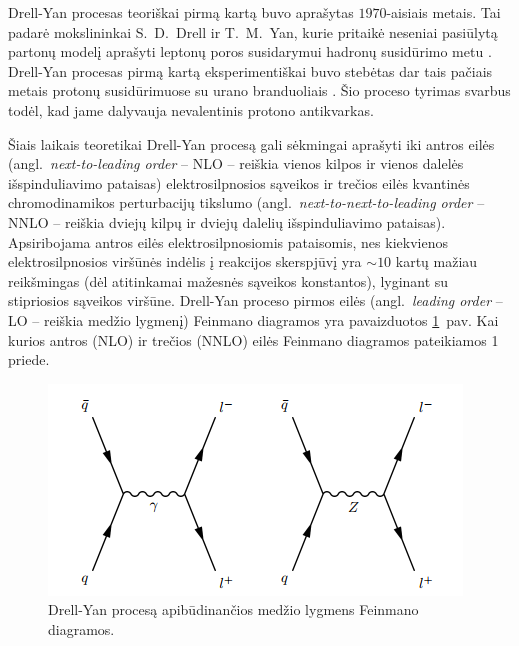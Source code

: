 \documentclass[a4paper, 12pt, oneside]{article}
\begin{document}
Drell-Yan procesas teoriškai pirmą kartą buvo aprašytas $1970$-aisiais metais.
Tai padarė mokslininkai S.~D.~Drell ir T.~M.~Yan, kurie pritaikė neseniai pasiūlytą partonų modelį aprašyti
leptonų poros susidarymui hadronų susidūrimo metu \cite{DYoriginal}.
Drell-Yan procesas pirmą kartą eksperimentiškai buvo stebėtas dar tais pačiais metais protonų susidūrimuose
su urano branduoliais \cite{DY_firstExp}.
Šio proceso tyrimas svarbus todėl, kad jame dalyvauja nevalentinis protono antikvarkas.

Šiais laikais teoretikai Drell-Yan procesą gali sėkmingai aprašyti iki antros eilės (angl.\ \textit{next-to-leading order} -- NLO --
reiškia vienos kilpos ir vienos dalelės išspinduliavimo pataisas) elektrosilpnosios sąveikos
ir trečios eilės kvantinės chromodinamikos perturbacijų tikslumo (angl.\ \textit{next-to-next-to-leading order} -- NNLO --
reiškia dviejų kilpų ir dviejų dalelių išspinduliavimo pataisas).
Apsiribojama antros eilės elektrosilpnosiomis pataisomis, nes kiekvienos elektrosilpnosios viršūnės indėlis į reakcijos skerspjūvį
yra $\sim\!10$ kartų mažiau reikšmingas (dėl atitinkamai mažesnės sąveikos konstantos), lyginant su stipriosios sąveikos viršūne.
Drell-Yan proceso pirmos eilės (angl.\ \textit{leading order} -- LO -- reiškia medžio lygmenį) Feinmano diagramos
yra pavaizduotos \ref{fig:DYfeyn}~pav.
Kai kurios antros (NLO) ir trečios (NNLO) eilės Feinmano diagramos pateikiamos 1 priede.

\begin{figure}[b]
\centering
\includegraphics[scale=0.75]{DYprocess.PNG}
\caption{Drell-Yan procesą apibūdinančios medžio lygmens Feinmano diagramos.}
\label{fig:DYfeyn}
\end{figure}
\end{document}
